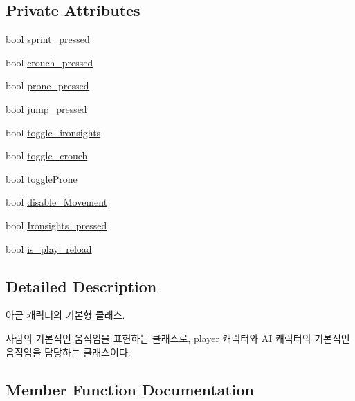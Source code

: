 \subsection*{Private Attributes}
\begin{DoxyCompactItemize}
\item 
bool \hyperlink{class_person___character_ada28cb357a985bcce3ab05cbb107e592}{sprint\+\_\+pressed}
\item 
bool \hyperlink{class_person___character_a06dac4071ddab3cffc34fd3f9f45f82c}{crouch\+\_\+pressed}
\item 
bool \hyperlink{class_person___character_a9abb5b7d14a87eeb58b3860630d61615}{prone\+\_\+pressed}
\item 
bool \hyperlink{class_person___character_ac015d26f3c92ec87951b7a5e6a56a70e}{jump\+\_\+pressed}
\item 
bool \hyperlink{class_person___character_a9a1116d9c0ecc72bb5b8d6b0c4a8d9df}{toggle\+\_\+ironsights}
\item 
bool \hyperlink{class_person___character_a0da4e0f8f35632e924380dc9f129c072}{toggle\+\_\+crouch}
\item 
bool \hyperlink{class_person___character_a2c93570440a103175c39a89de2b29192}{toggle\+Prone}
\item 
bool \hyperlink{class_person___character_a1ed8a1911232a5d7f47773978654d8ea}{disable\+\_\+\+Movement}
\item 
bool \hyperlink{class_person___character_a396ae4ccdc46544ebd28130bec8a46ea}{Ironsights\+\_\+pressed}
\item 
bool \hyperlink{class_person___character_af129a2f5b6da8448d8ee036761b9b737}{is\+\_\+play\+\_\+reload}
\end{DoxyCompactItemize}


\subsection{Detailed Description}
아군 캐릭터의 기본형 클래스. 

사람의 기본적인 움직임을 표현하는 클래스로, player 캐릭터와 AI 캐릭터의 기본적인 움직임을 담당하는 클래스이다. 

\subsection{Member Function Documentation}
